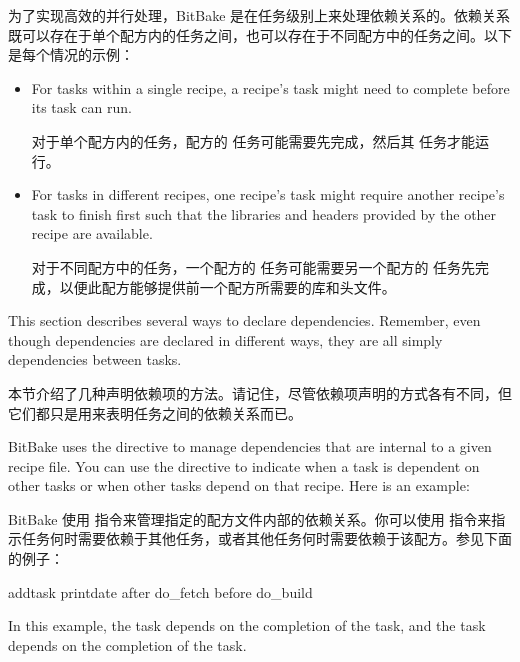 为了实现高效的并行处理，BitBake 是在任务级别上来处理依赖关系的。依赖关系既可以存在于单个配方内的任务之间，也可以存在于不同配方中的任务之间。以下是每个情况的示例：

\begin{itemize}
\setlength\itemsep{1.0em}
\item For tasks within a single recipe, a recipe's  task might need to complete before its  task can run.

\medskip
对于单个配方内的任务，配方的  任务可能需要先完成，然后其  任务才能运行。

\item For tasks in different recipes, one recipe's  task might require another recipe's  task to finish first such that the libraries and headers provided by the other recipe are available.

\medskip
对于不同配方中的任务，一个配方的  任务可能需要另一个配方的  任务先完成，以便此配方能够提供前一个配方所需要的库和头文件。
\end{itemize}

This section describes several ways to declare dependencies. Remember, even though dependencies are declared in different ways, they are all simply dependencies between tasks.

本节介绍了几种声明依赖项的方法。请记住，尽管依赖项声明的方式各有不同，但它们都只是用来表明任务之间的依赖关系而已。


BitBake uses the  directive to manage dependencies that are internal to a given recipe file. You can use the  directive to indicate when a task is dependent on other tasks or when other tasks depend on that recipe. Here is an example:

BitBake 使用  指令来管理指定的配方文件内部的依赖关系。你可以使用  指令来指示任务何时需要依赖于其他任务，或者其他任务何时需要依赖于该配方。参见下面的例子：

\begin{pyglist}
addtask printdate after do_fetch before do_build
\end{pyglist}

In this example, the  task depends on the completion of the  task, and the  task depends on the completion of the  task.

